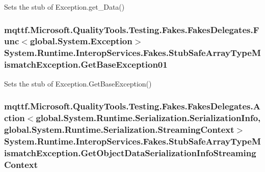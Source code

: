 Sets the stub of Exception.\-get\-\_\-\-Data()

\hypertarget{class_system_1_1_runtime_1_1_interop_services_1_1_fakes_1_1_stub_safe_array_type_mismatch_exception_a3d6ad6fef05bf993c5d1a58218eb61d4}{
\subsubsection[{Get\-Base\-Exception01}]{\setlength{\rightskip}{0pt plus 5cm}mqttf.\-Microsoft.\-Quality\-Tools.\-Testing.\-Fakes.\-Fakes\-Delegates.\-Func$<$global.\-System.\-Exception$>$ System.\-Runtime.\-Interop\-Services.\-Fakes.\-Stub\-Safe\-Array\-Type\-Mismatch\-Exception.\-Get\-Base\-Exception01}}\label{class_system_1_1_runtime_1_1_interop_services_1_1_fakes_1_1_stub_safe_array_type_mismatch_exception_a3d6ad6fef05bf993c5d1a58218eb61d4}


Sets the stub of Exception.\-Get\-Base\-Exception()

\hypertarget{class_system_1_1_runtime_1_1_interop_services_1_1_fakes_1_1_stub_safe_array_type_mismatch_exception_a3c0f0eb6efeccd6def74322a1c7f21f5}{
\subsubsection[{Get\-Object\-Data\-Serialization\-Info\-Streaming\-Context}]{\setlength{\rightskip}{0pt plus 5cm}mqttf.\-Microsoft.\-Quality\-Tools.\-Testing.\-Fakes.\-Fakes\-Delegates.\-Action$<$global.\-System.\-Runtime.\-Serialization.\-Serialization\-Info, global.\-System.\-Runtime.\-Serialization.\-Streaming\-Context$>$ System.\-Runtime.\-Interop\-Services.\-Fakes.\-Stub\-Safe\-Array\-Type\-Mismatch\-Exception.\-Get\-Object\-Data\-Serialization\-Info\-Streaming\-Context}}\label{class_system_1_1_runtime_1_1_interop_services_1_1_fakes_1_1_stub_safe_array_type_mismatch_exception_a3c0f0eb6efeccd6def74322a1c7f21f5}


